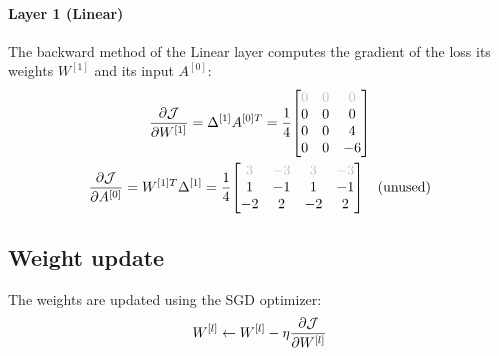 \paragraph{Layer 1 (Linear)} The backward method of the Linear layer computes the gradient of the loss \wrt its weights $W^{[1]}$ and its input $A^{[0]}$:
\begin{gather*}
    \pdv{\J}{W^{[1]}} = \Delta^{[1]} A^{[0]T} = \frac{1}{4} \mqty[
        \color{lightgray} 0 & \color{lightgray} 0 & \color{lightgray} 0 \\
        0 & 0 & 0 \\
        0 & 0 & 4 \\
        0 & 0 & -6
    ]\\
    \pdv{\J}{A^{[0]}} = W^{[1]T} \Delta^{[1]} = \frac{1}{4} \mqty[
        \color{lightgray} 3 & \color{lightgray} -3 & \color{lightgray} 3 & \color{lightgray} -3 \\
        1 & -1 & 1 & -1 \\
        -2 & 2 & -2 & 2
    ] \quad \text{(unused)}
\end{gather*}

\subsection{Weight update}

The weights are updated using the \ac{SGD} optimizer:
\begin{equation*}
    W^{[l]} \gets W^{[l]} - \eta \pdv{\mathcal{J}}{W^{[l]}} \\
\end{equation*}

